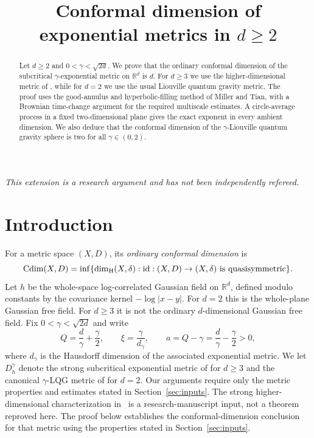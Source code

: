 \documentclass[11pt,reqno]{amsart}
\title[Conformal dimension of exponential metrics in $d\ge2$]{Conformal dimension of exponential metrics in $d\ge2$}
\author{}
\date{}
\theoremstyle{plain}
\theoremstyle{definition}
\theoremstyle{remark}
\newcommand{\R}{\mathbb R}
\newcommand{\Cdim}{\operatorname{Cdim}}
\newcommand{\1}{\mathbf{1}}
\begin{document}
\begin{abstract}
Let $d\ge 2$ and $0<\gamma<\sqrt{2d}$. We prove that the ordinary conformal dimension of the subcritical $\gamma$-exponential metric on $\mathbb R^d$ is $d$. For $d\ge3$ we use the higher-dimensional metric of \cite{Bonanno}, while for $d=2$ we use the usual Liouville quantum gravity metric. The proof uses the good-annulus and hyperbolic-filling method of Miller and Tian, with a Brownian time-change argument for the required multiscale estimates. A circle-average process in a fixed two-dimensional plane gives the exact exponent in every ambient dimension. We also deduce that the conformal dimension of the $\gamma$-Liouville quantum gravity sphere is two for all $\gamma\in(0,2)$.
\end{abstract}
\maketitle
\noindent\textit{This extension is a research argument and has not been independently refereed.}

\section{Introduction}\label{sec:intro}
For a metric space $(X,D)$, its \emph{ordinary conformal dimension} is
\begin{equation}\label{eq:cdim}
\Cdim(X,D)=\inf\{\dim_{\rm H}(X,\delta):\mathrm{id}:(X,D)\to(X,\delta)\text{ is quasisymmetric}\}.
\end{equation}
Let $h$ be the whole-space log-correlated Gaussian field on $\R^d$, defined modulo constants by the covariance kernel $-\log|x-y|$. For $d=2$ this is the whole-plane Gaussian free field. For $d\ge3$ it is not the ordinary $d$-dimensional Gaussian free field. Fix $0<\gamma<\sqrt{2d}$ and write
\begin{equation}\label{eq:parameters}
Q=\frac d\gamma+\frac\gamma2,\qquad \xi=\frac\gamma{d_\gamma},\qquad a=Q-\gamma=\frac d\gamma-\frac\gamma2>0,
\end{equation}
where $d_\gamma$ is the Hausdorff dimension of the associated exponential metric. We let $D_h^\gamma$ denote the strong subcritical exponential metric of \cite[Definition 1.1 and Theorem 1.2]{Bonanno} for $d\ge3$ and the canonical $\gamma$-LQG metric of \cite{GM} for $d=2$. Our arguments require only the metric properties and estimates stated in Section~\ref{sec:inputs}. The strong higher-dimensional characterization in~\cite{Bonanno} is a research-manuscript input, not a theorem reproved here. The proof below establishes the conformal-dimension conclusion for that metric using the properties stated in Section~\ref{sec:inputs}.
\end{document}
